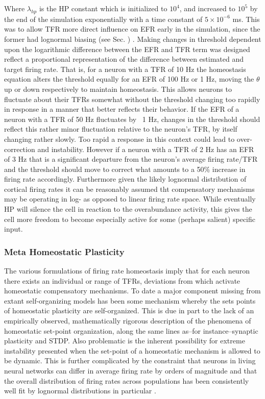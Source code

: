 \documentclass[10pt,letterpaper]{article}
\begin{document}
Where $\lambda_{hp}$ is the HP constant which is initialized to $10^4$, and increased to $10^5$ by the end of the simulation exponentially with a time constant of $5 \times 10^{-6}$ ms. This was to allow TFR more direct influence on EFR early in the simulation, since the former had lognormal biasing (see Sec. ) . Making changes in threshold dependent upon the logarithmic difference between the EFR and TFR term was designed reflect a proportional representation of the difference between estimated and target firing rate. That is, for a neuron with a TFR of 10 Hz the homeostasis equation alters the threshold equally for an EFR of 100 Hz or 1 Hz, moving the $\theta$ up or down respectively to maintain homeostasis. This allows neurons to fluctuate about their TFRs somewhat without the threshold changing too rapidly in response in a manner that better reflects their behavior. If the EFR of a neuron with a TFR of 50 Hz fluctuates by ~1 Hz, changes in the threshold should reflect this rather minor fluctuation relative to the neuron's TFR, by itself changing rather slowly. Too rapid a response in this context could lead to over-correction and instability. However if a neuron with a TFR of 2 Hz has an EFR of 3 Hz that is a significant departure from the neuron's average firing rate/TFR and the threshold should move to correct what amounts to a 50\% increase in firing rate accordingly. Furthermore given the likely lognormal distribution of cortical firing rates it can be reasonably assumed tht compensatory mechanisms may be operating in log- as opposed to linear firing rate space. While eventually HP will silence the cell in reaction to the overabundance activity, this gives the cell more freedom to become especially active for some (perhaps salient) specific input.  

\subsubsection*{Meta Homeostatic Plasticity}
\label{sec:MHP}

The various formulations of firing rate homeostasis imply that for each neuron there exists an individual or range of TFRs, deviations from which activate homeostatic compensatory mechanisms. To date a major component missing from extant self-organizing models has been some mechanism whereby the sets points of homeostatic plasticity are self-organized. This is due in part to the lack of an empirically observed, mathematically rigorous description of the phenomena of homeostatic set-point organization, along the same lines as--for instance--synaptic plasticity and STDP. Also problematic is the inherent possibility for extreme instability presented  when the set-point of a homeostatic mechanism is allowed to be dynamic. This is further complicated by the constraint that neurons in living neural networks can differ in average firing rate by orders of magnitude and that the overall distribution of firing rates across populations has been consistently well fit by lognormal distributions in particular \cite{hromadka2008sparse, mizuseki2013preconfigured, buzsaki2014log, nigam2016}. 
\end{document}

